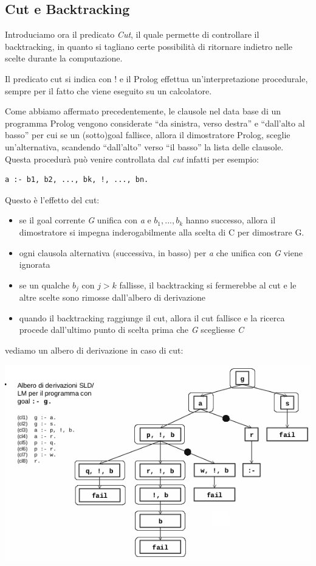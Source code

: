 \documentclass[a4paper]{report}
\begin{document}
\begin{itemize}
\subsection{Cut e Backtracking}
Introduciamo ora il predicato \emph{Cut}, il quale permette di controllare il backtracking, in quanto si tagliano certe possibilità
di ritornare indietro nelle scelte durante la computazione.

Il predicato cut si indica con $!$ e il Prolog effettua un'interpretazione procedurale, sempre per il fatto che viene eseguito su un calcolatore.

Come abbiamo affermato precedentemente, le clausole nel data base di un programma Prolog vengono considerate “da sinistra, verso destra”
e “dall'alto al basso” per cui se un (sotto)goal fallisce, allora il dimostratore Prolog, sceglie un'alternativa,
scandendo “dall'alto” verso “il basso” la lista delle clausole.
Questa procedurà può venire controllata dal \textit{cut} infatti per esempio:
\begin{verbatim}
a :- b1, b2, ..., bk, !, ..., bn.
\end{verbatim}
Questo è l'effetto del cut:
\begin{itemize}
\item se il goal corrente \textit{G} unifica con \textit{a} e $b_1,...,b_k$ hanno successo,
      allora il dimostratore si impegna inderogabilmente alla scelta di C per dimostrare G.
\item ogni clausola alternativa (successiva, in basso) per \textit{a} che unifica con \textit{G} viene ignorata
\item se un qualche $b_j$ con $j > k$ fallisse, il backtracking si fermerebbe al cut e le altre scelte sono rimosse dall'albero di derivazione
\item quando il backtracking raggiunge il cut, allora il cut fallisce e la ricerca procede dall’ultimo punto di scelta
      prima che \textit{G} scegliesse \textit{C}
\end{itemize}
vediamo un albero di derivazione in caso di cut:
\begin{center}
	\includegraphics[scale=0.8]{img/cut.png}

\end{center}
\end{itemize}
\end{document}
